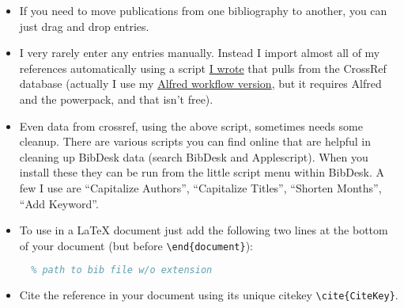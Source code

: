\begin{itemize}
\begin{itemize}
\end{itemize}
\item If you need to move publications from one bibliography to another, you can just drag and drop entries.
\item I very rarely enter any entries manually. Instead I import almost all of my references automatically using a script \href{https://github.com/byuflowlab/bibteximport}{I wrote} that pulls from the CrossRef database (actually I use my \href{https://github.com/andrewning/alfred-workflows-scientific}{Alfred workflow version}, but it requires Alfred and the powerpack, and that isn't free).
\item Even data from crossref, using the above script, sometimes needs some cleanup.  There are various scripts you can find online that are helpful in cleaning up BibDesk data (search BibDesk and Applescript).  When you install these they can be run from the little script menu within BibDesk.  A few I use are ``Capitalize Authors'', ``Capitalize Titles'', ``Shorten Months'', ``Add Keyword''.
\item To use in a LaTeX document just add the following two lines at the bottom of your document (but before \texttt{\textbackslash end\{document\}}):

\begin{lstlisting}[language=tex]
  % depending on journal style
  % path to bib file w/o extension
\end{lstlisting}

\item Cite the reference in your document using its unique citekey \texttt{\textbackslash cite\{CiteKey\}}. 
\end{itemize}





